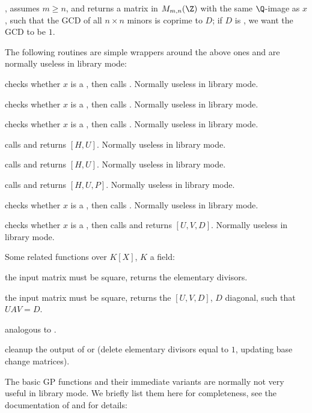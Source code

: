 , assumes $m\geq n$, and returns
a matrix in $M_{m,n}(\Z)$ with the same $\Q$-image as $x$, such that
the GCD of all $n\times n$ minors is coprime to $D$; if $D$ is ,
we want the GCD to be $1$.
\smallskip

The following routines are simple wrappers around the above ones and are
normally useless in library mode:

 checks whether $x$ is a , then calls .
Normally useless in library mode.

 checks whether $x$ is a , then calls
. Normally useless in library mode.

 checks whether $x$ is a , then calls
. Normally useless in library mode.

 calls
 and returns $[H, U]$. Normally useless in library
mode.

 calls  and returns $[H,
U]$. Normally useless in library mode.

 calls  and returns
$[H, U, P]$. Normally useless in library mode.

 checks whether $x$ is a , then calls
. Normally useless in library mode.

 checks whether $x$ is a , then calls
 and returns $[U,V,D]$. Normally useless in
library mode.

\noindent Some related functions over $K[X]$, $K$ a field:

 the input matrix must be square, returns the
elementary divisors.

 the input matrix must be square, returns the
$[U,V,D]$, $D$ diagonal, such that $UAV = D$.

 analogous to .

 cleanup the output of  or
 (delete elementary divisors equal to $1$, updating base
change matrices).


The basic GP functions and their immediate variants are normally not very
useful in library mode. We briefly list them here for completeness, see the
documentation of  and  for details:

